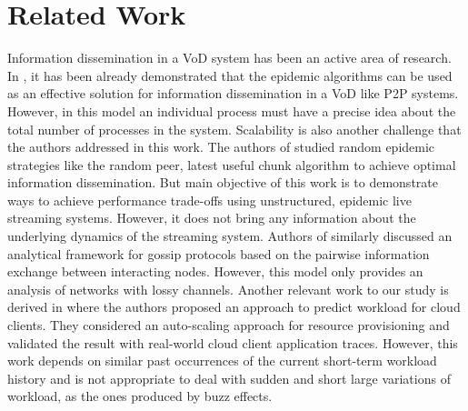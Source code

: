 \documentclass[twoside]{article}
\newcommand{\paulo}[2]{#2}
\newcommand{\roy}[2]{#2}
\begin{document}
\section{Related Work}
\label{sec:related}
Information dissemination in a  VoD system has been an active area of research. In \cite{EugEpi2004}, it has been already demonstrated that the epidemic algorithms can be used as an effective solution for information dissemination in a VoD like P2P systems. \roy{}{However, in this model an individual process must have a precise idea about the total number of processes in the system. Scalability is also another challenge that the authors addressed in this work}. The authors of \cite{BonalEpistream2008} studied random epidemic strategies like the random peer, latest useful chunk algorithm to achieve optimal information dissemination. But main objective of this work is to demonstrate ways to achieve performance trade-offs using unstructured, epidemic live streaming systems. However, it does not bring any information about the underlying dynamics of the \roy{}{streaming} system. Authors of \cite{BakhshiCQST11} similarly discussed an analytical framework for gossip protocols based on the pairwise information exchange between interacting nodes. However, this model only provides an analysis of networks with lossy channels. Another relevant work to our study is derived in \cite{CarPatMatch2010} where the authors proposed an approach to predict workload for \paulo{the}{} cloud clients. They considered an auto-scaling approach for resource provisioning and validated the result with real-world cloud client application traces. However, this work depends on similar past occurrences of the current short-term workload history and is not appropriate to deal with sudden and short large variations of workload, as the ones produced by buzz effects.
\end{document}
